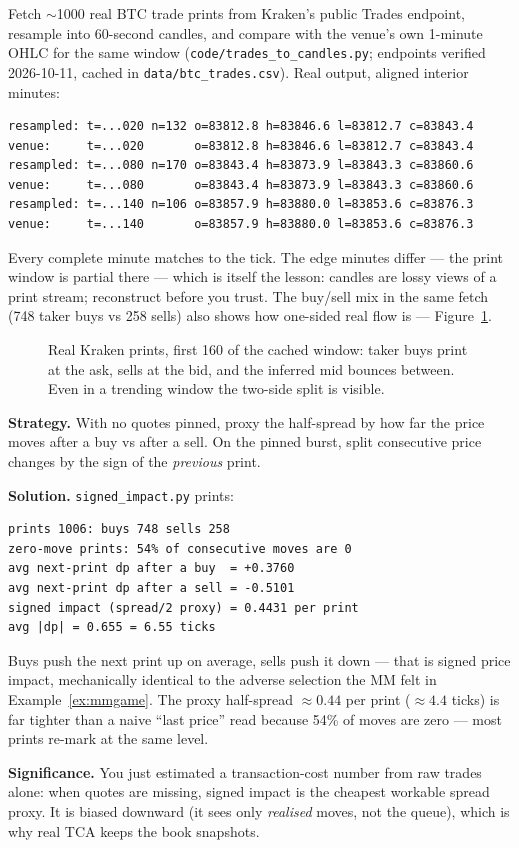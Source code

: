 \begin{example}\label{ex:candles}
Fetch $\sim$1000 real BTC trade prints from Kraken's public Trades
endpoint, resample into 60-second candles, and compare with the
venue's own 1-minute OHLC for the same window
(\texttt{code/trades\_to\_candles.py}; endpoints verified
2026-10-11, cached in \texttt{data/btc\_trades.csv}). Real output,
aligned interior minutes:
\begin{lstlisting}[numbers=none]
resampled: t=...020 n=132 o=83812.8 h=83846.6 l=83812.7 c=83843.4
venue:     t=...020       o=83812.8 h=83846.6 l=83812.7 c=83843.4
resampled: t=...080 n=170 o=83843.4 h=83873.9 l=83843.3 c=83860.6
venue:     t=...080       o=83843.4 h=83873.9 l=83843.3 c=83860.6
resampled: t=...140 n=106 o=83857.9 h=83880.0 l=83853.6 c=83876.3
venue:     t=...140       o=83857.9 h=83880.0 l=83853.6 c=83876.3
\end{lstlisting}
Every complete minute matches to the tick. The edge minutes differ
--- the print window is partial there --- which is itself the lesson:
candles are lossy views of a print stream; reconstruct before you
trust. The buy/sell mix in the same fetch (748 taker buys vs 258
sells) also shows how one-sided real flow is ---
Figure~\ref{fig:bounce}.
\end{example}

\begin{figure}[ht]\centering

\caption{Real Kraken prints, first 160 of the cached window: taker
buys print at the ask, sells at the bid, and the inferred mid
bounces between. Even in a trending window the two-side split is
visible.}
\label{fig:bounce}
\end{figure}

\begin{example}\label{ex:signimpact}
\textbf{Strategy.} With no quotes pinned, proxy the half-spread by
how far the price moves after a buy vs after a sell. On the pinned
burst, split consecutive price changes by the sign of the
\emph{previous} print.

\textbf{Solution.} \texttt{signed\_impact.py} prints:
\begin{verbatim}
prints 1006: buys 748 sells 258
zero-move prints: 54% of consecutive moves are 0
avg next-print dp after a buy  = +0.3760
avg next-print dp after a sell = -0.5101
signed impact (spread/2 proxy) = 0.4431 per print
avg |dp| = 0.655 = 6.55 ticks
\end{verbatim}
Buys push the next print up on average, sells push it down --- that
is signed price impact, mechanically identical to the adverse
selection the MM felt in Example~\ref{ex:mmgame}. The proxy
half-spread $\approx 0.44$ per print ($\approx 4.4$ ticks) is far
tighter than a naive ``last price'' read because 54\% of moves are
zero --- most prints re-mark at the same level.

\textbf{Significance.} You just estimated a transaction-cost number
from raw trades alone: when quotes are missing, signed impact is
the cheapest workable spread proxy. It is biased downward (it sees
only \emph{realised} moves, not the queue), which is why real TCA
keeps the book snapshots.
\end{example}

